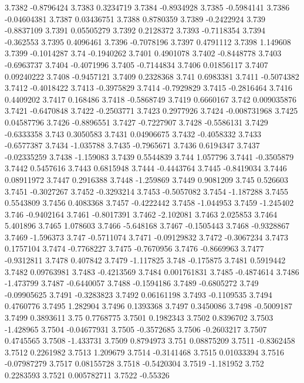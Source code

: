 3.7382  -0.8796424
3.7383  0.3234719
3.7384  -0.8934928
3.7385  -0.5984141
3.7386  -0.04604381
3.7387  0.03436751
3.7388  0.8780359
3.7389  -0.2422924
3.739  -0.8837109
3.7391  0.05505279
3.7392  0.2128372
3.7393  -0.7118354
3.7394  -0.362553
3.7395  0.4096461
3.7396  -0.7078196
3.7397  0.4791112
3.7398  1.149608
3.7399  -0.1014287
3.74  -0.1940262
3.7401  0.4901078
3.7402  -0.8448778
3.7403  -0.6963737
3.7404  -0.4071996
3.7405  -0.7144834
3.7406  0.01856117
3.7407  0.09240222
3.7408  -0.9457121
3.7409  0.2328368
3.741  0.6983381
3.7411  -0.5074382
3.7412  -0.4018422
3.7413  -0.3975829
3.7414  -0.7929829
3.7415  -0.2816464
3.7416  0.4409202
3.7417  0.168486
3.7418  -0.5868749
3.7419  0.6660167
3.742  0.009035876
3.7421  -0.6470848
3.7422  -0.2503771
3.7423  0.2977926
3.7424  -0.008731968
3.7425  0.04587796
3.7426  -0.8896551
3.7427  -0.7227907
3.7428  -0.5586131
3.7429  -0.6333358
3.743  0.3050583
3.7431  0.04906675
3.7432  -0.4058332
3.7433  -0.6577387
3.7434  -1.035788
3.7435  -0.7965671
3.7436  0.6194347
3.7437  -0.02335259
3.7438  -1.159083
3.7439  0.5544839
3.744  1.057796
3.7441  -0.3505879
3.7442  0.5457616
3.7443  0.6815948
3.7444  -0.4443764
3.7445  -0.8419034
3.7446  0.08911972
3.7447  0.2916388
3.7448  -1.259869
3.7449  0.9081209
3.745  0.526603
3.7451  -0.3027267
3.7452  -0.3293214
3.7453  -0.5057082
3.7454  -1.187288
3.7455  0.5543809
3.7456  0.4083368
3.7457  -0.4222442
3.7458  -1.044953
3.7459  -1.245402
3.746  -0.9402164
3.7461  -0.8017391
3.7462  -2.102081
3.7463  2.025853
3.7464  5.401896
3.7465  1.078603
3.7466  -5.648168
3.7467  -0.1505443
3.7468  -0.9328867
3.7469  -1.596373
3.747  -0.5711074
3.7471  -0.09129832
3.7472  -0.3067234
3.7473  0.1757104
3.7474  -0.7768227
3.7475  -0.7670956
3.7476  -0.8669963
3.7477  -0.9312811
3.7478  0.407842
3.7479  -1.117825
3.748  -0.175875
3.7481  0.5919442
3.7482  0.09763981
3.7483  -0.4213569
3.7484  0.001761831
3.7485  -0.4874614
3.7486  -1.473799
3.7487  -0.6440057
3.7488  -0.1594186
3.7489  -0.6805272
3.749  -0.09905625
3.7491  -0.3283823
3.7492  0.06161198
3.7493  -0.1109535
3.7494  0.4760776
3.7495  1.282904
3.7496  0.1393368
3.7497  0.3450086
3.7498  -0.5009187
3.7499  0.3893611
3.75  0.7768775
3.7501  0.1982343
3.7502  0.8396702
3.7503  -1.428965
3.7504  -0.04677931
3.7505  -0.3572685
3.7506  -0.2603217
3.7507  0.4745565
3.7508  -1.433731
3.7509  0.8794973
3.751  0.08875209
3.7511  -0.8362458
3.7512  0.2261982
3.7513  1.209679
3.7514  -0.3141468
3.7515  0.01033394
3.7516  -0.07987279
3.7517  0.08155728
3.7518  -0.5420304
3.7519  -1.181952
3.752  0.2283593
3.7521  0.005782711
3.7522  -0.55326

